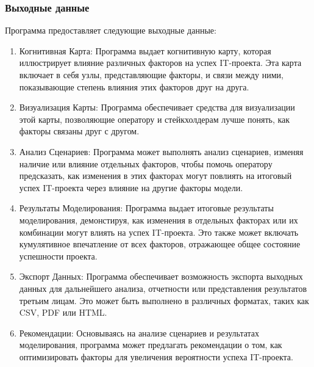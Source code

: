 \documentclass{article}
\begin{document}
    \subsubsection{Выходные данные}
    Программа предоставляет следующие выходные данные:\\
    \begin{enumerate}
        \item  Когнитивная Карта: Программа выдает когнитивную карту, которая иллюстрирует влияние различных факторов на успех IT-проекта. Эта карта включает в себя узлы, представляющие факторы, и связи между ними, показывающие степень влияния этих факторов друг на друга.
        \item  Визуализация Карты: Программа обеспечивает средства для визуализации этой карты, позволяющие оператору и стейкхолдерам лучше понять, как факторы связаны друг с другом.
        \item  Анализ Сценариев: Программа может выполнять анализ сценариев, изменяя наличие или влияние отдельных факторов, чтобы помочь оператору предсказать, как изменения в этих факторах могут повлиять на итоговый успех IT-проекта через влияние на другие факторы модели.
        \item  Результаты Моделирования: Программа выдает итоговые результаты моделирования, демонстируя, как изменения в отдельных факторах или их комбинации могут влиять на успех IT-проекта. Это также может включать кумулятивное впечатление от всех факторов, отражающее общее состояние успешности проекта.
        \item  Экспорт Данных: Программа обеспечивает возможность экспорта выходных данных для дальнейшего анализа, отчетности или представления результатов третьим лицам. Это может быть выполнено в различных форматах, таких как CSV, PDF или HTML.
        \item  Рекомендации: Основываясь на анализе сценариев и результатах моделирования, программа может предлагать рекомендации о том, как оптимизировать факторы для увеличения вероятности успеха IT-проекта.
    \end{enumerate}
\end{document}
